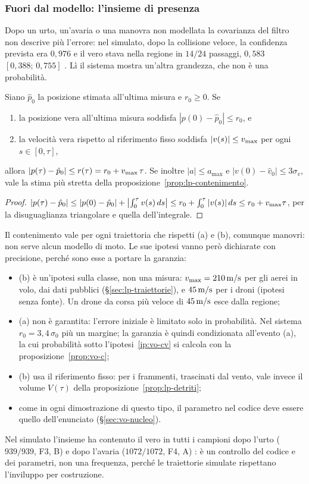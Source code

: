 \subsubsection{Fuori dal modello: l'insieme di presenza}\label{sec:vo-presenza}

Dopo un urto, un'avaria o una manovra non modellata la covarianza del filtro non descrive più l'errore: nel simulato, dopo la collisione veloce, la confidenza prevista era $0{,}976$ e il vero stava nella regione in $14/24$ passaggi, $0{,}583$ $[0{,}388;\,0{,}755]$ . Lì il sistema mostra un'altra grandezza, che non è una probabilità.

\begin{proposizione}\label{prop:vo-presenza}
Siano $\hat p_0$ la posizione stimata all'ultima misura e $r_0\ge0$. Se
\begin{enumerate}[label=(\alph*)]
\item la posizione vera all'ultima misura soddisfa $|p(0)-\hat p_0|\le r_0$, e
\item la velocità vera rispetto al riferimento fisso soddisfa $|v(s)|\le v_{\max}$ per ogni $s\in[0,\tau]$,
\end{enumerate}
allora $|p(\tau)-\hat p_0|\le r(\tau)=r_0+v_{\max}\,\tau$. Se inoltre $|a|\le a_{\max}$ e $|v(0)-\hat v_0|\le3\sigma_v$, vale la stima più stretta della proposizione~\ref{prop:lp-contenimento}.
\end{proposizione}
\begin{proof}
$|p(\tau)-\hat p_0|\le|p(0)-\hat p_0|+\bigl|\int_0^\tau v(s)\,ds\bigr|\le r_0+\int_0^\tau|v(s)|\,ds\le r_0+v_{\max}\tau$, per la disuguaglianza triangolare e quella dell'integrale.
\end{proof}
Il contenimento vale per ogni traiettoria che rispetti (a) e (b), comunque manovri: non serve alcun modello di moto. Le sue ipotesi vanno però dichiarate con precisione, perché sono esse a portare la garanzia:
\begin{itemize}
\item (b) è un'ipotesi sulla classe, non una misura: $v_{\max}=210\,\mathrm{m/s}$ per gli aerei in volo, dai dati pubblici (\S\ref{sec:lp-traiettorie}), e $45\,\mathrm{m/s}$ per i droni (ipotesi senza fonte). Un drone da corsa più veloce di $45\,\mathrm{m/s}$ esce dalla regione;
\item (a) non è garantita: l'errore iniziale è limitato solo in probabilità. Nel sistema $r_0=3{,}4\,\sigma_0$ più un margine; la garanzia è quindi condizionata all'evento (a), la cui probabilità sotto l'ipotesi~\ref{ip:vo-cv} si calcola con la proposizione~\ref{prop:vo-c};
\item (b) usa il riferimento fisso: per i frammenti, trascinati dal vento, vale invece il volume $V(\tau)$ della proposizione~\ref{prop:lp-detriti};
\item come in ogni dimostrazione di questo tipo, il parametro nel codice deve essere quello dell'enunciato (\S\ref{sec:vo-nucleo}).
\end{itemize}
Nel simulato l'insieme ha contenuto il vero in tutti i campioni dopo l'urto ($939/939$, F3, B) e dopo l'avaria ($1072/1072$, F4, A) : è un controllo del codice e dei parametri, non una frequenza, perché le traiettorie simulate rispettano l'inviluppo per costruzione.

